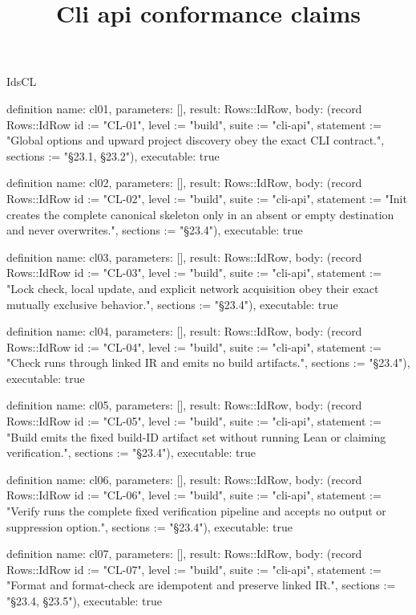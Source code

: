 \begin{lexlean}{IdsCL}
\title{Cli api conformance claims}
\begin{semanticmodule}
definition{
  name: cl01,
  parameters: [],
  result: Rows::IdRow,
  body: (record Rows::IdRow {id := "CL-01", level := "build", suite := "cli-api", statement := "Global options and upward project discovery obey the exact CLI contract.", sections := "§23.1, §23.2"}),
  executable: true
}

definition{
  name: cl02,
  parameters: [],
  result: Rows::IdRow,
  body: (record Rows::IdRow {id := "CL-02", level := "build", suite := "cli-api", statement := "Init creates the complete canonical skeleton only in an absent or empty destination and never overwrites.", sections := "§23.4"}),
  executable: true
}

definition{
  name: cl03,
  parameters: [],
  result: Rows::IdRow,
  body: (record Rows::IdRow {id := "CL-03", level := "build", suite := "cli-api", statement := "Lock check, local update, and explicit network acquisition obey their exact mutually exclusive behavior.", sections := "§23.4"}),
  executable: true
}

definition{
  name: cl04,
  parameters: [],
  result: Rows::IdRow,
  body: (record Rows::IdRow {id := "CL-04", level := "build", suite := "cli-api", statement := "Check runs through linked IR and emits no build artifacts.", sections := "§23.4"}),
  executable: true
}

definition{
  name: cl05,
  parameters: [],
  result: Rows::IdRow,
  body: (record Rows::IdRow {id := "CL-05", level := "build", suite := "cli-api", statement := "Build emits the fixed build-ID artifact set without running Lean or claiming verification.", sections := "§23.4"}),
  executable: true
}

definition{
  name: cl06,
  parameters: [],
  result: Rows::IdRow,
  body: (record Rows::IdRow {id := "CL-06", level := "build", suite := "cli-api", statement := "Verify runs the complete fixed verification pipeline and accepts no output or suppression option.", sections := "§23.4"}),
  executable: true
}

definition{
  name: cl07,
  parameters: [],
  result: Rows::IdRow,
  body: (record Rows::IdRow {id := "CL-07", level := "build", suite := "cli-api", statement := "Format and format-check are idempotent and preserve linked IR.", sections := "§23.4, §23.5"}),
  executable: true
}


\end{semanticmodule}
\end{lexlean}
